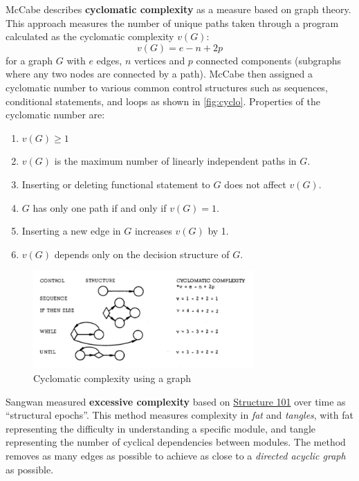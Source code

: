 McCabe \cite{1702388} describes \textbf{cyclomatic complexity} as a measure based on graph theory. This approach measures the number of unique paths taken through a program calculated as the cyclomatic complexity \(v(G)\):
\[
v(G) = e - n + 2p
\]
for a graph \(G\) with \(e\) edges, \(n\) vertices and \(p\) connected components (subgraphs where any two nodes are connected by a path). McCabe then assigned a cyclomatic number to various common control structures such as sequences, conditional statements, and loops as shown in \autoref{fig:cyclo}. Properties of the cyclomatic number are:

\begin{enumerate}
	\item \(v(G) \geq 1\)
	\item \(v(G)\) is the maximum number of linearly independent paths in \(G\).
	\item Inserting or deleting functional statement to \(G\) does not affect \(v(G)\).
	\item \(G\) has only one path if and only if \(v(G) = 1\).
	\item Inserting a new edge in \(G\) increases \(v(G)\) by 1.
	\item \(v(G)\) depends only on the decision structure of \(G\).
\end{enumerate}

\begin{figure}[htbp]
	\centering
	\includegraphics[width=0.75\textwidth]{images/cyclo.png}
	\caption{Cyclomatic complexity using a graph}
	\label{fig:cyclo}
\end{figure}

Sangwan \cite{4548410} measured \textbf{excessive complexity} based on \href{https://structure101.com}{Structure 101} over time as ``structural epochs''. This method measures complexity in \emph{fat} and \emph{tangles}, with fat representing the difficulty in understanding a specific module, and tangle representing the number of cyclical dependencies between modules. The method removes as many edges as possible to achieve as close to a \emph{directed acyclic graph} as possible.

